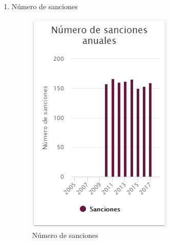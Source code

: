\begin{itemize}
\begin{enumerate}
	\item Número de sanciones 
	\begin{figure}[hbtp]
	\includegraphics[scale=0.7]{images/InterfazMovil/IUGS15_sancionesTodos.PNG}
	\caption{Número de sanciones}
	\end{figure}
	
	\end{enumerate}
	
\end{itemize}